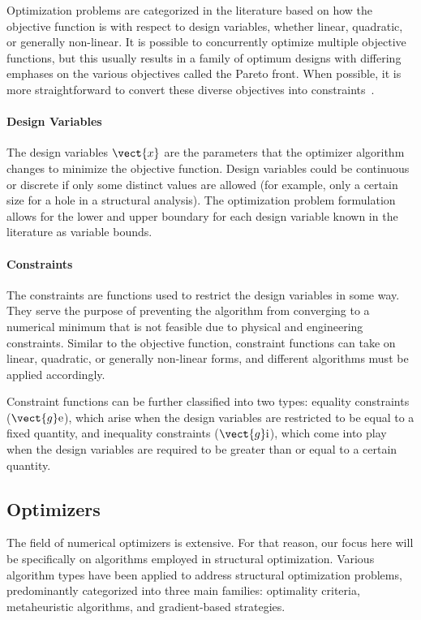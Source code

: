 Optimization problems are categorized in the literature based on how the objective function is with respect to design variables, whether linear, quadratic, or generally non-linear. It is possible to concurrently optimize multiple objective functions, but this usually results in a family of optimum designs with differing emphases on the various objectives called the Pareto front. When possible, it is more straightforward to convert these diverse objectives into constraints~.

\paragraph{Design Variables}
The design variables $\vect{x}$ are the parameters that the optimizer algorithm changes to minimize the objective function. Design variables could be continuous or discrete if only some distinct values are allowed (for example, only a certain size for a hole in a structural analysis). The optimization problem formulation allows for the lower and upper boundary for each design variable known in the literature as variable bounds.

\paragraph{Constraints}
The constraints are functions used to restrict the design variables in some way. They serve the purpose of preventing the algorithm from converging to a numerical minimum that is not feasible due to physical and engineering constraints. Similar to the objective function, constraint functions can take on linear, quadratic, or generally non-linear forms, and different algorithms must be applied accordingly.

Constraint functions can be further classified into two types: equality constraints ($\vect{g}\text{e}$), which arise when the design variables are restricted to be equal to a fixed quantity, and inequality constraints ($\vect{g}\text{i}$), which come into play when the design variables are required to be greater than or equal to a certain quantity.

\subsection{Optimizers}
The field of numerical optimizers is extensive. For that reason, our focus here will be specifically on algorithms employed in structural optimization. Various algorithm types have been applied to address structural optimization problems, predominantly categorized into three main families: optimality criteria, metaheuristic algorithms, and gradient-based strategies.

